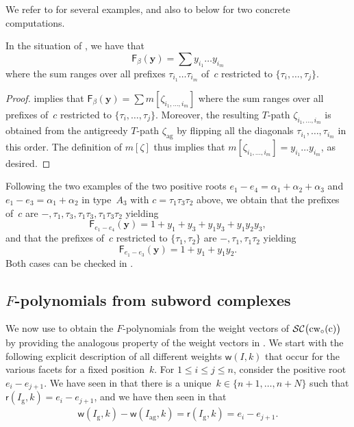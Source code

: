 \documentclass[ALCO,Unicode,ThmDefs]{cedram}
\newcommand{\y}{\mathbf{y}}
\newcommand{\subwordComplex}{\mathcal{SC}}
\newcommand{\clusterComplex}{\subwordComplex\big(\cw{c}\big)}
\newcommand{\greedy}{I_{\operatorname{g}}}
\newcommand{\antigreedy}{I_{\operatorname{ag}}}
\newcommand{\Fpoly}[2]{{\mathsf{F}_{#1}(#2)}}
\newcommand{\zetaag}{{\zeta_{\operatorname{ag}}}}
\newcommand{\sq}[1]{{\rm #1}}
\newcommand{\sfr}{\mathsf{r}}
\newcommand{\sfw}{\mathsf{w}}
\newcommand{\wo}{{w_\circ}}
\newcommand{\sw}[2]{\sq{#1}(\sq{#2})}
\newcommand{\cwo}[1]{\sw{\wo}{#1}}
\newcommand{\cw}[1]{\sq{#1}\cwo{#1}}
\newcommand{\Root}[2]{{\sfr}(#1,#2)}
\newcommand{\Weight}[2]{{\sfw}(#1,#2)}
\begin{document}
We refer to  for several examples, and also to  below for two concrete computations.

\begin{coro}\label{cor:TpathAn2}
In the situation of , we have that
\[
\Fpoly{\beta}{\y} = \sum y_{i_1}\dots y_{i_m}
\]
where the sum ranges over all prefixes $\tau_{i_1} \dots \tau_{i_m}$ of~$c$ restricted to $\{\tau_i,\dots,\tau_{j}\}$.
\end{coro}

\begin{proof}
 implies that $\Fpoly{\beta}{\y} = \sum m[\zeta_{i_1,\dots,i_m}]$ where the sum ranges over all prefixes of~$c$ restricted to $\{\tau_i,\dots,\tau_j\}$. Moreover, the resulting $T$-path $\zeta_{i_1,\dots,i_m}$ is obtained from the antigreedy $T$-path $\zetaag$ by flipping all the diagonals $\tau_{i_1},\dots,\tau_{i_m}$ in this order. The definition of $m[\zeta]$ thus implies that $m[\zeta_{i_1,\dots,i_m}] = y_{i_1}\dots y_{i_m}$, as desired.
\end{proof}

\begin{exem}\label{ex:A3two}
Following the two examples of the two positive roots $e_1-e_4 = \alpha_1+\alpha_2+\alpha_3$ and $e_1-e_3 = \alpha_1+\alpha_2$ in type~$A_3$ with $c=\tau_1\tau_3\tau_2$ above, we obtain that the prefixes of~$c$ are $-,\tau_1,\tau_3,\tau_1\tau_3,\tau_1\tau_3\tau_2$ yielding
\[
\Fpoly{e_1-e_4}{\y} = 1 + y_1 + y_3 + y_1y_3 + y_1y_2y_3,
\]
and that the prefixes of~$c$ restricted to $\{\tau_1,\tau_2\}$ are $-,\tau_1,\tau_1\tau_2$ yielding
\[
\Fpoly{e_1-e_3}{\y} = 1 + y_1 + y_1y_2.
\]
Both cases can be checked in .
\end{exem}

\subsection{\texorpdfstring{$F$}{F}-polynomials from subword complexes}

We now use  to obtain the $F$-polynomials from the weight vectors of $\clusterComplex$ by providing the analogous property of the weight vectors in . We start with the following explicit description of all different weights $\Weight{I}{k}$ that occur for the various facets for a fixed position~$k$. For $1 \leq i \leq j \leq n$, consider the positive root $e_i - e_{j+1}$. We have seen in  that there is a unique~$k \in \{n+1,\dots,n+N\}$ such that $\Root{\greedy}{k} = e_i - e_{j+1}$, and we have then seen in  that
\begin{align}
\Weight{\greedy}{k} - \Weight{\antigreedy}{k} = \Root{\greedy}{k} = e_i - e_{j+1}. \label{eq:weighttypeA}
\end{align}
\end{document}
